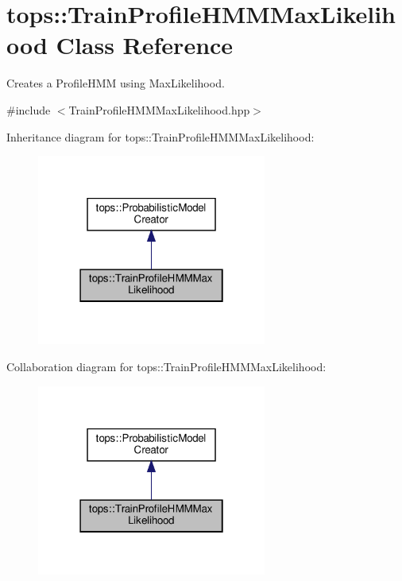 \hypertarget{classtops_1_1TrainProfileHMMMaxLikelihood}{}\section{tops\+:\+:Train\+Profile\+H\+M\+M\+Max\+Likelihood Class Reference}
\label{classtops_1_1TrainProfileHMMMaxLikelihood}


Creates a Profile\+H\+MM using Max\+Likelihood.  




{\ttfamily \#include $<$Train\+Profile\+H\+M\+M\+Max\+Likelihood.\+hpp$>$}



Inheritance diagram for tops\+:\+:Train\+Profile\+H\+M\+M\+Max\+Likelihood\+:
\nopagebreak
\begin{figure}[H]
\begin{center}
\leavevmode
\includegraphics[width=214pt]{classtops_1_1TrainProfileHMMMaxLikelihood__inherit__graph}
\end{center}
\end{figure}


Collaboration diagram for tops\+:\+:Train\+Profile\+H\+M\+M\+Max\+Likelihood\+:
\nopagebreak
\begin{figure}[H]
\begin{center}
\leavevmode
\includegraphics[width=214pt]{classtops_1_1TrainProfileHMMMaxLikelihood__coll__graph}
\end{center}
\end{figure}
